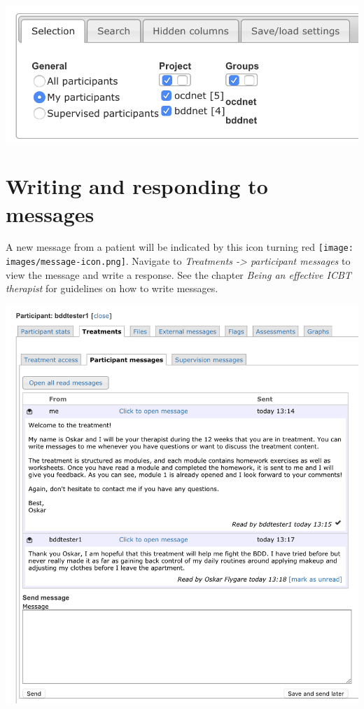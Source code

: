 \documentclass[]{book}
\theoremstyle{definition}
\theoremstyle{definition}
\theoremstyle{definition}
\theoremstyle{remark}
\begin{document}
\includegraphics{images/filter-participants.png}

\hypertarget{writing-and-responding-to-messages}{%
\section{Writing and responding to
messages}\label{writing-and-responding-to-messages}}

A new message from a patient will be indicated by this icon turning red
\texttt{[image: images/message-icon.png]}. Navigate to \emph{Treatments
-\textgreater{} participant messages} to view the message and write a
response. See the chapter \emph{Being an effective ICBT therapist} for
guidelines on how to write messages.

\includegraphics{images/therapist-messages.png}
\end{document}
